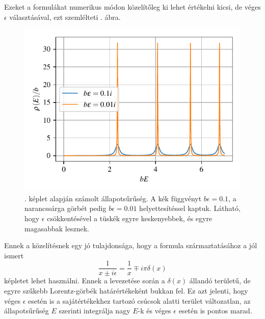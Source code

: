 Ezeket a formulákat numerikus módon közelítőleg ki lehet értékelni kicsi, de véges $\epsilon$ választásával, ezt szemlélteti . ábra.
\begin{figure}[H]
	\centering
	\includegraphics[scale=1]{./figs/dosfromgreen.pdf}
	\caption[Állapotsűrűség]{. képlet alapján számolt állapotsűrűség. A kék függvényt $b\epsilon = 0.1$, a narancssárga görbét pedig $b\epsilon = 0.01$ helyettesítéssel kaptuk. Látható, hogy $\epsilon$ csökkentésével a tüskék egyre keskenyebbek, és egyre magasabbak lesznek.}
	\label{green:állapotsűrség}
\end{figure}
Ennek a közelítésnek egy jó tulajdonsága, hogy a formula származtatásához a jól ismert
\begin{equation}
	\frac{1}{x\pm i\epsilon} = \frac{1}{x}\mp i\pi\delta(x)
\end{equation}
képletet lehet használni. Ennek a levezetése során a $\delta(x)$ állandó területű, de egyre szűkebb Lorentz-görbék határértékeként bukkan fel. Ez azt jelenti, hogy véges $\epsilon$ esetén is a sajátértékekhez tartozó csúcsok alatti terület változatlan, az állapotsűrűség $E$ szerinti integrálja nagy $E$-k és véges $\epsilon$ esetén is pontos marad.

